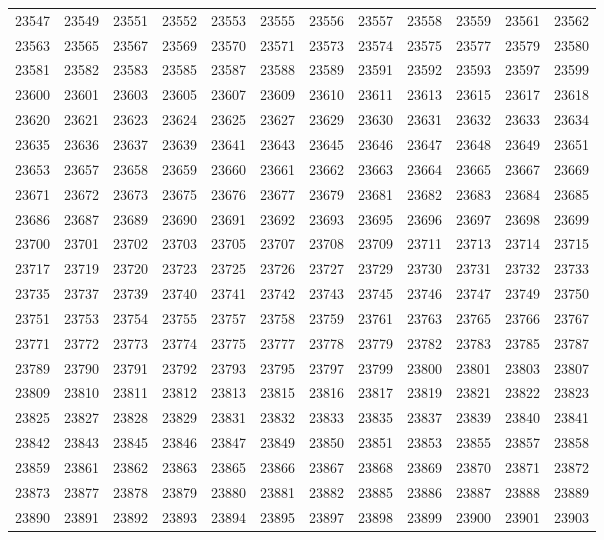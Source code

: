 \begin{center}
\begin{longtable}{llllllllllll}
23547 &23549 &23551 &23552 &23553 &23555 &23556 &23557 &23558 &23559 &23561 &23562 \\
23563 &23565 &23567 &23569 &23570 &23571 &23573 &23574 &23575 &23577 &23579 &23580 \\
23581 &23582 &23583 &23585 &23587 &23588 &23589 &23591 &23592 &23593 &23597 &23599 \\
23600 &23601 &23603 &23605 &23607 &23609 &23610 &23611 &23613 &23615 &23617 &23618 \\
23620 &23621 &23623 &23624 &23625 &23627 &23629 &23630 &23631 &23632 &23633 &23634 \\
23635 &23636 &23637 &23639 &23641 &23643 &23645 &23646 &23647 &23648 &23649 &23651 \\
23653 &23657 &23658 &23659 &23660 &23661 &23662 &23663 &23664 &23665 &23667 &23669 \\
23671 &23672 &23673 &23675 &23676 &23677 &23679 &23681 &23682 &23683 &23684 &23685 \\
23686 &23687 &23689 &23690 &23691 &23692 &23693 &23695 &23696 &23697 &23698 &23699 \\
23700 &23701 &23702 &23703 &23705 &23707 &23708 &23709 &23711 &23713 &23714 &23715 \\
23717 &23719 &23720 &23723 &23725 &23726 &23727 &23729 &23730 &23731 &23732 &23733 \\
23735 &23737 &23739 &23740 &23741 &23742 &23743 &23745 &23746 &23747 &23749 &23750 \\
23751 &23753 &23754 &23755 &23757 &23758 &23759 &23761 &23763 &23765 &23766 &23767 \\
23771 &23772 &23773 &23774 &23775 &23777 &23778 &23779 &23782 &23783 &23785 &23787 \\
23789 &23790 &23791 &23792 &23793 &23795 &23797 &23799 &23800 &23801 &23803 &23807 \\
23809 &23810 &23811 &23812 &23813 &23815 &23816 &23817 &23819 &23821 &23822 &23823 \\
23825 &23827 &23828 &23829 &23831 &23832 &23833 &23835 &23837 &23839 &23840 &23841 \\
23842 &23843 &23845 &23846 &23847 &23849 &23850 &23851 &23853 &23855 &23857 &23858 \\
23859 &23861 &23862 &23863 &23865 &23866 &23867 &23868 &23869 &23870 &23871 &23872 \\
23873 &23877 &23878 &23879 &23880 &23881 &23882 &23885 &23886 &23887 &23888 &23889 \\
23890 &23891 &23892 &23893 &23894 &23895 &23897 &23898 &23899 &23900 &23901 &23903 \\

\end{longtable}
\end{center}
